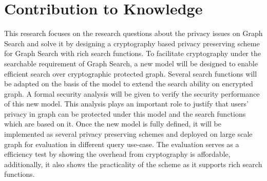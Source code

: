 \chapter{Contribution to Knowledge}
This research focuses on the research questions about the privacy issues on Graph Search and solve it by designing a cryptography based privacy preserving scheme for Graph Search with rich search functions. 
To facilitate cryptography under the searchable requirement of Graph Search, a new model will be designed to enable efficient search over cryptographic protected graph. Several search functions will be adapted on the basis of the model to extend the search ability on encrypted graph. 
A formal security analysis will be given to verify the security performance of this new model. This analysis plays an important role to justify that users' privacy in graph can be protected under this model and the search functions which are based on it. 
Once the new model is fully defined, it will be implemented as several privacy preserving schemes and deployed on large scale graph for evaluation in different query use-case. The evaluation serves as a efficiency test by showing the overhead from cryptography is affordable, additionally, it also shows the practicality of the scheme as it supports rich search functions.